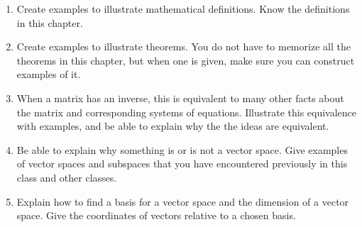 
\begin{enumerate}

\item Create examples to illustrate mathematical definitions. Know the definitions in this chapter.
\item Create examples to illustrate theorems. You do not have to memorize all the theorems in this chapter, but when one is given, make sure you can construct examples of it. 
\item When a matrix has an inverse, this is equivalent to many other facts about the matrix and corresponding systems of equations.  Illustrate this equivalence with examples, and be able to explain why the the ideas are equivalent.
\item Be able to explain why something is or is not a vector space. Give examples of vector spaces and subspaces that you have encountered previously in this class and other classes.
\item Explain how to find a basis for a vector space and the dimension of a vector space. Give the coordinates of vectors relative to a chosen basis.

\end{enumerate}

